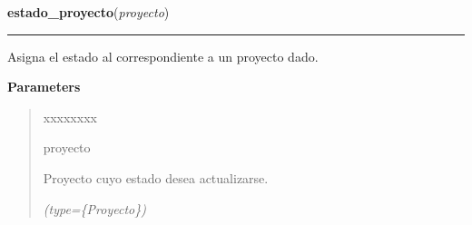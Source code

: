     \label{saip:lib:func:estado_proyecto}

    \vspace{0.5ex}

\hspace{.8\funcindent}\begin{boxedminipage}{\funcwidth}

    \raggedright \textbf{estado\_proyecto}(\textit{proyecto})

    \vspace{-1.5ex}

    \rule{\textwidth}{0.5\fboxrule}
\setlength{\parskip}{2ex}
    Asigna el estado al correspondiente a un proyecto dado.

\setlength{\parskip}{1ex}
      \textbf{Parameters}
      \vspace{-1ex}

      \begin{quote}
        \begin{Ventry}{xxxxxxxx}

          \item[proyecto]

          Proyecto cuyo estado desea actualizarse.

            {\it (type=\{Proyecto\})}

        \end{Ventry}

      \end{quote}

    \end{boxedminipage}

    \label{saip:lib:func:estado_fase}

    \vspace{0.5ex}

